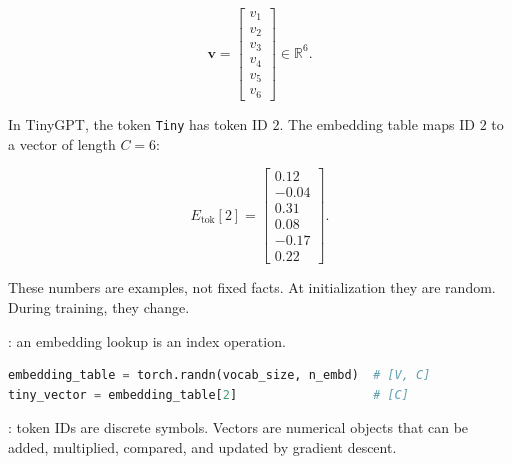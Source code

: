 \[
\mathbf{v} =
\begin{bmatrix}
v_1\\v_2\\v_3\\v_4\\v_5\\v_6
\end{bmatrix}
\in \mathbb{R}^{6}.
\]

In TinyGPT, the token \texttt{Tiny} has token ID \(2\). The embedding table maps ID \(2\) to a vector of length \(C=6\):

\[
E_{\text{tok}}[2] =
\begin{bmatrix}
0.12\\
-0.04\\
0.31\\
0.08\\
-0.17\\
0.22
\end{bmatrix}.
\]

These numbers are examples, not fixed facts. At initialization they are random. During training, they change.

\begin{center}
\end{center}

: an embedding lookup is an index operation.

\begin{lstlisting}[language=Python]
embedding_table = torch.randn(vocab_size, n_embd)  # [V, C]
tiny_vector = embedding_table[2]                   # [C]
\end{lstlisting}

: token IDs are discrete symbols. Vectors are numerical objects that can be added, multiplied, compared, and updated by gradient descent.

